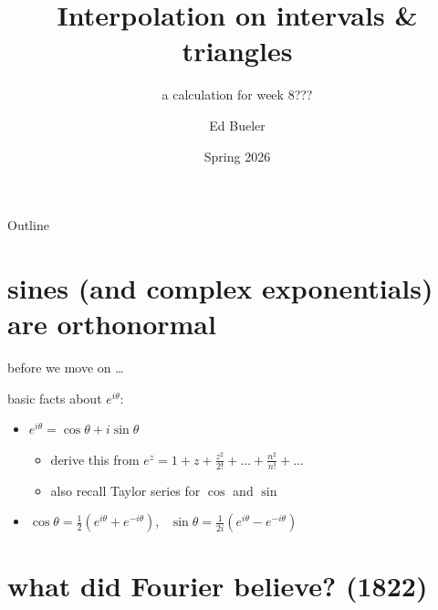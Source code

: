 \documentclass[10pt,
               svgnames,
               hyperref={colorlinks,
                         citecolor=DeepPink4,
                         linkcolor=FireBrick,
                         urlcolor=blue},
               usepdftitle=false]{beamer}
\title{Interpolation on intervals \& triangles}
\subtitle{a calculation for week 8???}
\author{Ed Bueler}
\institute[]{UAF Math 617 Functional Analysis}
\date{Spring 2026}
\newcommand{\ds}{\displaystyle}
\begin{document}
\beamertemplatenavigationsymbolsempty

\begin{frame}
  \maketitle
\end{frame}


\begin{frame}{Outline}
  \tableofcontents[hideallsubsections]
\end{frame}

\AtBeginSection[]
{%
}


\section{sines (and complex exponentials) are orthonormal}


\begin{frame}{before we move on \dots}

\begin{block}{basic facts about $e^{i\theta}$:}
\begin{itemize}
\item $\ds e^{i\theta}=\cos\theta + i \sin\theta$
    \begin{itemize}
    \item[$\circ$] derive this from $e^z = 1 + z + \frac{z^2}{2!} + \dots + \frac{n^2}{n!} + \dots$
    \item[$\circ$] also recall Taylor series for $\cos$ and $\sin$
    \end{itemize}
\item $\ds \cos\theta = \frac{1}{2}\left(e^{i\theta}+e^{-i\theta}\right)$, \, $\ds \sin\theta = \frac{1}{2i}\left(e^{i\theta}-e^{-i\theta}\right)$
\end{itemize}
\end{block}
\end{frame}


\AtBeginSection[] {
    \begin{frame}{Outline}
    \setbeamertemplate{section in toc}[sections numbered]
    \tableofcontents[currentsection]%
    \end{frame}
}


\section{what did Fourier believe? (1822)}
\end{document}
